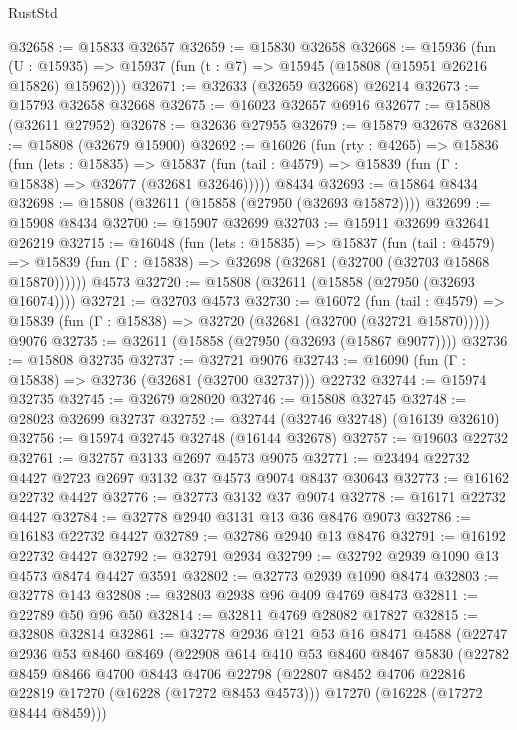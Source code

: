 \begin{lexlean}{RustStd}
\begin{coremodule}
@32658 := @15833 @32657
@32659 := @15830 @32658
@32668 := @15936
    (fun (U : @15935) => @15937 (fun (t : @7) => @15945 (@15808 (@15951 @26216 @15826) @15962)))
@32671 := @32633 (@32659 @32668) @26214
@32673 := @15793 @32658 @32668
@32675 := @16023 @32657 @6916
@32677 := @15808 (@32611 @27952)
@32678 := @32636 @27955
@32679 := @15879 @32678
@32681 := @15808 (@32679 @15900)
@32692 := @16026
    (fun (rty : @4265) =>
    @15836
      (fun (lets : @15835) =>
      @15837 (fun (tail : @4579) => @15839 (fun (Γ : @15838) => @32677 (@32681 @32646)))))
    @8434
@32693 := @15864 @8434
@32698 := @15808 (@32611 (@15858 (@27950 (@32693 @15872))))
@32699 := @15908 @8434
@32700 := @15907 @32699
@32703 := @15911 @32699 @32641 @26219
@32715 := @16048
    (fun (lets : @15835) =>
    @15837
      (fun (tail : @4579) =>
      @15839 (fun (Γ : @15838) => @32698 (@32681 (@32700 (@32703 @15868 @15870))))))
    @4573
@32720 := @15808 (@32611 (@15858 (@27950 (@32693 @16074))))
@32721 := @32703 @4573
@32730 := @16072
    (fun (tail : @4579) => @15839 (fun (Γ : @15838) => @32720 (@32681 (@32700 (@32721 @15870)))))
    @9076
@32735 := @32611 (@15858 (@27950 (@32693 (@15867 @9077))))
@32736 := @15808 @32735
@32737 := @32721 @9076
@32743 := @16090 (fun (Γ : @15838) => @32736 (@32681 (@32700 @32737))) @22732
@32744 := @15974 @32735
@32745 := @32679 @28020
@32746 := @15808 @32745
@32748 := @28023 @32699 @32737
@32752 := @32744 (@32746 @32748) (@16139 @32610)
@32756 := @15974 @32745 @32748 (@16144 @32678)
@32757 := @19603 @22732
@32761 := @32757 @3133 @2697 @4573 @9075
@32771 := @23494 @22732 @4427 @2723 @2697 @3132 @37 @4573 @9074 @8437 @30643
@32773 := @16162 @22732 @4427
@32776 := @32773 @3132 @37 @9074
@32778 := @16171 @22732 @4427
@32784 := @32778 @2940 @3131 @13 @36 @8476 @9073
@32786 := @16183 @22732 @4427
@32789 := @32786 @2940 @13 @8476
@32791 := @16192 @22732 @4427
@32792 := @32791 @2934
@32799 := @32792 @2939 @1090 @13 @4573 @8474 @4427 @3591
@32802 := @32773 @2939 @1090 @8474
@32803 := @32778 @143
@32808 := @32803 @2938 @96 @409 @4769 @8473
@32811 := @22789 @50 @96 @50
@32814 := @32811 @4769 @28082 @17827
@32815 := @32808 @32814
@32861 := @32778
    @2936
    @121
    @53
    @16
    @8471
    @4588
    (@22747
      @2936
      @53
      @8460
      @8469
      (@22908
        @614
        @410
        @53
        @8460
        @8467
        @5830
        (@22782
          @8459
          @8466
          @4700
          @8443
          @4706
          @22798
          (@22807 @8452 @4706 @22816 @22819 @17270 (@16228 (@17272 @8453 @4573)))
          @17270
          (@16228 (@17272 @8444 @8459)))

\end{coremodule}
\end{lexlean}
